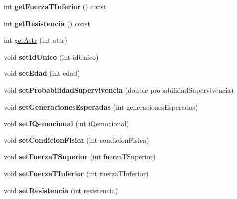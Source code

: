 \begin{DoxyCompactItemize}
int {\bfseries get\+Fuerza\+T\+Inferior} () const
\item 
\mbox{\label{classGladiator_a5c5b2363f99e9bb758f8a03f06c4756d}} 
int {\bfseries get\+Resistencia} () const
\item 
int \hyperlink{classGladiator_a0c32c46ee2659f7328f4c9d0a0a6940f}{get\+Attr} (int attr)
\item 
\mbox{\label{classGladiator_a2ffbee614e8007bbd17b07b28067f67a}} 
void {\bfseries set\+Id\+Unico} (int id\+Unico)
\item 
\mbox{\label{classGladiator_a68261455353aec833f4c0947ca51864a}} 
void {\bfseries set\+Edad} (int edad)
\item 
\mbox{\label{classGladiator_a1f46d7ff00026aa208c8e9a3dd07d5ca}} 
void {\bfseries set\+Probabilidad\+Supervivencia} (double probabilidad\+Supervivencia)
\item 
\mbox{\label{classGladiator_ad8cd214e8b4ae8d5637cede9256b9737}} 
void {\bfseries set\+Generaciones\+Esperadas} (int generaciones\+Esperadas)
\item 
\mbox{\label{classGladiator_a1e8e49fe6a8d9b8a9888b1c91aeaf492}} 
void {\bfseries set\+I\+Qemocional} (int i\+Qemocional)
\item 
\mbox{\label{classGladiator_a302efd0e63fb2ae25957ac23b059bc92}} 
void {\bfseries set\+Condicion\+Fisica} (int condicion\+Fisica)
\item 
\mbox{\label{classGladiator_a7d68998c41f4e0516ac46be1b4c69623}} 
void {\bfseries set\+Fuerza\+T\+Superior} (int fuerza\+T\+Superior)
\item 
\mbox{\label{classGladiator_a81e5604192fc9f57a8afe5d3b072ee56}} 
void {\bfseries set\+Fuerza\+T\+Inferior} (int fuerza\+T\+Inferior)
\item 
\mbox{\label{classGladiator_a2d5786861997c83e62eef41de02a1d7e}} 
void {\bfseries set\+Resistencia} (int resistencia)
\item 
\mbox{\label{classGladiator_a6160da4acce4d3896e32b5628d25d58c}} 

\end{DoxyCompactItemize}
